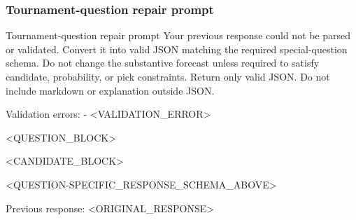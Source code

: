 \documentclass[sigconf,nonacm]{acmart}
\newcommand{\promptheadingbreak}{\leavevmode\par\nopagebreak[4]}
\begin{document}
\subsubsection*{Tournament-question repair prompt}
\promptheadingbreak
\begin{promptbox}{Tournament-question repair prompt}
Your previous response could not be parsed or validated.
Convert it into valid JSON matching the required special-question schema.
Do not change the substantive forecast unless required to satisfy candidate, probability, or pick constraints.
Return only valid JSON. Do not include markdown or explanation outside JSON.

Validation errors:
- <VALIDATION_ERROR>

<QUESTION_BLOCK>

<CANDIDATE_BLOCK>

<QUESTION-SPECIFIC_RESPONSE_SCHEMA_ABOVE>

Previous response:
<ORIGINAL_RESPONSE>
\end{promptbox}
\end{document}
